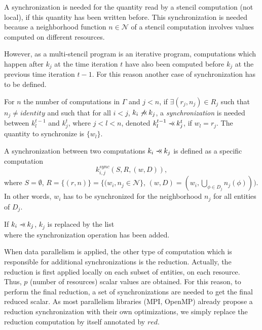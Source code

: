 A synchronization is needed for the quantity read by a stencil computation (not local), if this quantity has been written before. This synchronization is needed because a neighborhood function $n \in \mathcal{N}$ of a stencil computation involves values computed on different resources.

However, as a multi-stencil program is an iterative program, computations which happen after $k_j$ at the time iteration $t$ have also been computed before $k_j$ at the previous time iteration $t-1$. For this reason another case of synchronization has to be defined.

\begin{mydef}
For $n$ the number of computations in $\Gamma$ and $j<n$, if $\exists (r_j,n_j) \in R_j$ such that $n_j\neq identity$ and such that for all $i<j$, $k_i \not \pprec k_j$, a \textit{synchronization} is needed between $k_l^{t-1}$ and $k_j^t$, where $j<l<n$, denoted $k_l^{t-1} \pprec k_j^{t}$, if $w_l=r_j$. The quantity to synchronize is $\{w_l\}$.
\label{def:sync2}
\end{mydef}

\begin{mydef}
A synchronization between two computations $k_i \pprec k_j$ is defined as a specific computation 
\begin{equation*}
k_{i,j}^{sync}(S,R,(w,D)), 
\end{equation*}
where $S=\emptyset$, $R=\{(r,n)\}=\{(w_i,n_j \in \mathcal{N}\}$, $(w,D)=(w_i,\bigcup_{\phi \in D_j} n_j(\phi)))$. In other words, $w_i$ has to be synchronized for the neighborhood $n_j$ for all entities of $D_j$.
\label{def:sync3}
\end{mydef}

\begin{mydef}
If $k_i \pprec k_j$, $k_j$ is replaced by the list
\begin{equation*}
[k_{i,j}^{sync}, k_j]
\end{equation*}
where the synchronization operation has been added.
\end{mydef}

When data parallelism is applied, the other type of computation which is responsible for additional synchronizations is the reduction. Actually, the reduction is first applied locally on each subset of entities, on each resource. Thus, $p$ (number of resources) scalar values are obtained. For this reason, to perform the final reduction, a set of synchronizations are needed to get the final reduced scalar. As most parallelism libraries (MPI, OpenMP) already propose a reduction synchronization with their own optimizations, we simply replace the reduction computation by itself annotated by $red$.

